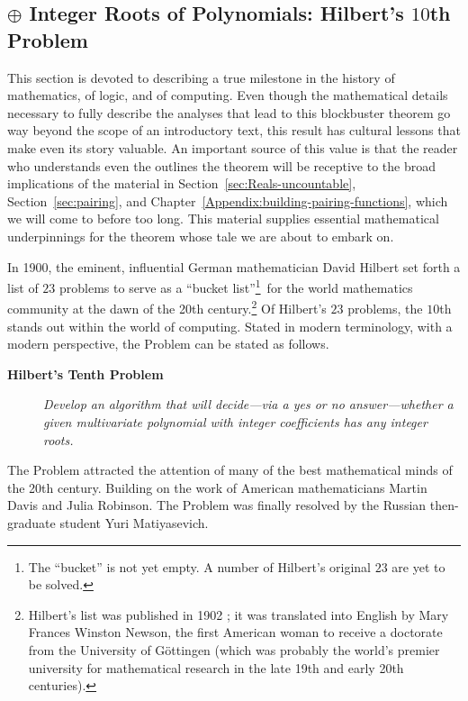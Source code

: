 \subsection{$\oplus$ Integer Roots of Polynomials: Hilbert's $10$th Problem}
\label{sec:Hilberts-Tenth}

This section is devoted to describing a true milestone in the history of mathematics, of logic, and of computing.  Even though the mathematical details necessary to fully describe the analyses that lead to this blockbuster theorem go way beyond the scope of an introductory text, this result has cultural lessons that make even its story valuable.  An important source of this value is that the reader who understands even the outlines the theorem will be receptive to the broad implications of the material in Section~\ref{sec:Reals-uncountable}, Section~\ref{sec:pairing}, and Chapter~\ref{Appendix:building-pairing-functions}, which we will come to before too long.  This material supplies essential mathematical underpinnings for the theorem whose tale we are about to embark on.

\medskip

   

In 1900, the eminent, influential German mathematician David Hilbert set forth a list of $23$ problems to serve as a ``bucket list''\footnote{The ``bucket'' is not yet empty.  A number of Hilbert's original $23$ are yet to be solved.}~for the world mathematics community at the dawn of the 20th century.\footnote{Hilbert's list was published in 1902 \cite{Hilbert02}; it was translated into English by Mary Frances Winston Newson, the first American woman to receive a doctorate from the University of G\"{o}ttingen (which was probably the world's premier university for mathematical research in the late 19th and early 20th centuries).}  Of Hilbert's $23$ problems, the $10$th stands out within the world of computing.  Stated in modern terminology, with a modern perspective, the Problem can be stated as follows.
\begin{description}
\item[{\bf Hilbert's Tenth Problem}]
{\it Develop an algorithm that will decide---via a {\sc yes} or {\sc no} answer---whether a given multivariate polynomial with integer coefficients has any integer roots.}
\end{description}
The Problem attracted the attention of many of the best mathematical minds of the 20th century.  Building on the work of American mathematicians Martin Davis and Julia Robinson.  The Problem was finally resolved by the Russian then-graduate student Yuri Matiyasevich.
  

